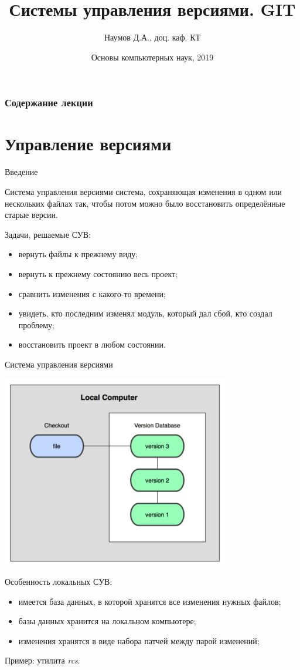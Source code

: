 \documentclass{beamer}
\title[GIT]{Системы управления версиями. GIT}
\author{Наумов Д.А., доц. каф. КТ}
\date[18.04.2019] {Основы компьютерных наук, 2019}
\begin{document}
\begin{frame}
  \titlepage
\end{frame}
  
\begin{frame}
  \frametitle{Содержание лекции}
  \tableofcontents  
\end{frame}
  
\section{Управление версиями}

\begin{frame}{Введение}
\begin{block}{Система управления версиями}
система, сохраняющая изменения в одном или нескольких файлах так, чтобы потом можно было восстановить определённые старые версии.
\end{block}
Задачи, решаемые СУВ:
\begin{itemize}
\item вернуть файлы к прежнему виду;
\item вернуть к прежнему состоянию весь проект;
\item сравнить изменения с какого-то времени;
\item увидеть, кто последним изменял модуль, который дал сбой, кто создал проблему;
\item восстановить проект в любом состоянии.
\end{itemize}
\end{frame} 

\begin{frame}
\begin{block}{Система управления версиями}
\begin{center}
\includegraphics[scale=0.5]{images/local.png}
\end{center}
\end{block}
Особенность локальных СУВ:
\begin{itemize}
\item имеется база данных, в которой хранятся все изменения нужных файлов;
\item базы данных хранится на локальном компьютере;
\item изменения хранятся в виде набора патчей между парой изменений;
\end{itemize}
Пример: утилита \textit{rcs}.
\end{frame} 
\end{document}
